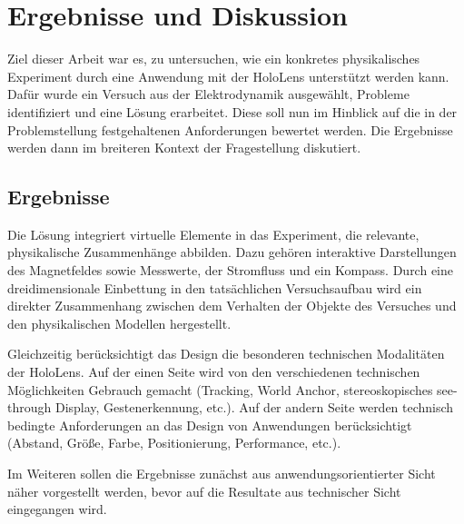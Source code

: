 \section{Ergebnisse und Diskussion}
\label{sec-6}

Ziel dieser Arbeit war es, zu untersuchen, wie ein konkretes physikalisches Experiment durch eine Anwendung mit der HoloLens unterstützt werden kann. Dafür wurde ein Versuch aus der Elektrodynamik ausgewählt, Probleme identifiziert und eine Lösung erarbeitet. Diese soll nun im Hinblick auf die in der Problemstellung festgehaltenen Anforderungen bewertet werden. Die Ergebnisse werden dann im breiteren Kontext der Fragestellung diskutiert.

\subsection{Ergebnisse}
 Die Lösung integriert virtuelle Elemente in das Experiment, die relevante, physikalische Zusammenhänge abbilden. Dazu gehören interaktive Darstellungen des Magnetfeldes sowie Messwerte, der Stromfluss und ein Kompass. Durch eine dreidimensionale Einbettung in den tatsächlichen Versuchsaufbau wird ein direkter Zusammenhang zwischen dem Verhalten der Objekte des Versuches und den physikalischen Modellen hergestellt.
 \par
 \noindent\hspace*{5mm}
 Gleichzeitig berücksichtigt das Design die besonderen technischen Modalitäten der HoloLens. Auf der einen Seite wird von den verschiedenen technischen Möglichkeiten Gebrauch gemacht (Tracking, World Anchor, stereoskopisches see-through Display, Gestenerkennung, etc.). Auf der andern Seite werden technisch bedingte Anforderungen an das Design von Anwendungen berücksichtigt (Abstand, Größe, Farbe, Positionierung, Performance, etc.).
 \par
 \noindent\hspace*{5mm}
 Im Weiteren sollen die Ergebnisse zunächst aus anwendungsorientierter Sicht näher vorgestellt werden, bevor auf die Resultate aus technischer Sicht eingegangen wird.
 
